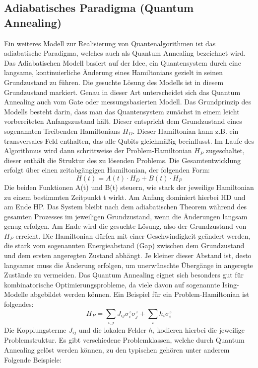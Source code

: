 \subsection{Adiabatisches Paradigma (Quantum Annealing)}
Ein weiteres Modell zur Realisierung von Quantenalgorithmen ist das adiabatische Paradigma, welches auch als Quantum Annealing bezeichnet wird. Das Adiabatischen Modell basiert auf der Idee, ein Quantensystem durch eine langsame, kontinuierliche Änderung eines Hamiltonians gezielt in seinen Grundzustand zu führen. Die gesuchte Lösung des Modells ist in diesem Grundzustand markiert. Genau in dieser Art unterscheidet sich das Quantum Annealing auch vom Gate oder messungsbasierten Modell. 
Das Grundprinzip des Modells besteht darin, dass man das Quantensystem zunächst in einem leicht vorbereiteten Anfangszustand hält. Dieser entspricht dem Grundzustand eines sogenannten Treibenden Hamiltonians $H_D$. Dieser Hamiltonian kann z.B. ein transversales Feld enthalten, das alle Qubits gleichmäßig beeinflusst. Im Laufe des Algorithmus wird dann schrittweise der Problem-Hamiltonian $H_P$ zugeschaltet, dieser enthält die Struktur des zu lösenden Problems. Die Gesamtentwicklung erfolgt über einen zeitabgängigen Hamiltonian, der folgenden Form:
$$
H(t) = A(t) \cdot H_D + B(t) \cdot H_P
$$
Die beiden Funktionen A(t) und B(t) steuern, wie stark der jeweilige Hamiltonian zu einem bestimmten Zeitpunkt t wirkt. Am Anfang dominiert hierbei HD und am Ende HP. Das System bleibt nach dem adiabatischen Theorem während des gesamten Prozesses im jeweiligen Grundzustand, wenn die Änderungen langsam genug erfolgen. Am Ende wird die gesuchte Lösung, also der Grundzustand von $H_P$ erreicht.
Die Hamiltonian dürfen mit einer Geschwindigkeit geändert werden, die stark vom sogenannten Energieabstand (Gap) zwischen dem Grundzustand und dem ersten angeregten Zustand abhängt. Je kleiner dieser Abstand ist, desto langsamer muss die Änderung erfolgen, um unerwünschte Übergänge in angeregte Zustände zu vermeiden. 
Das Quantum Annealing eignet sich besonders gut für kombinatorische Optimierungsprobleme, da viele davon auf sogenannte Ising-Modelle abgebildet werden können. Ein Beispiel für ein Problem-Hamiltonian ist folgendes:
$$
H_P = \sum_{i,j} J_{ij}\sigma_i^z\sigma_j^z + \sum_i h_i\sigma_i^z
$$
Die Kopplungsterme $J_{ij}$ und die lokalen Felder $h_i$ kodieren hierbei die jeweilige Problemstruktur.
Es gibt verschiedene Problemklassen, welche durch Quantum Annealing gelöst werden können, zu den typischen gehören unter anderem Folgende Beispiele: 
